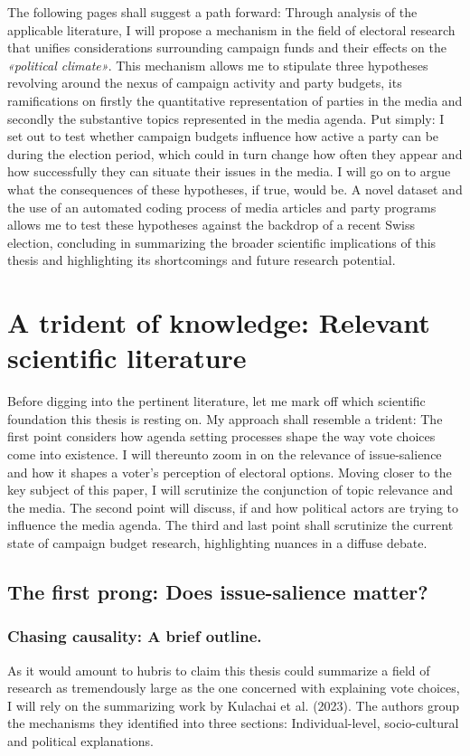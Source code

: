 \documentclass[11pt,a4paper]{article}
\begin{document}
The following pages shall suggest a path forward: Through analysis of the applicable literature, I will propose a mechanism in the field of electoral research that unifies considerations surrounding campaign funds and their effects on the \textit{«political climate»}. This mechanism allows me to stipulate three hypotheses revolving around the nexus of campaign activity and party budgets, its ramifications on firstly the quantitative representation of parties in the media and secondly the substantive topics represented in the media agenda. Put simply: I set out to test whether campaign budgets influence how active a party can be during the election period, which could in turn change how often they appear and how successfully they can situate their issues in the media. I will go on to argue what the consequences of these hypotheses, if true, would be. A novel dataset and the use of an automated coding process of media articles and party programs allows me to test these hypotheses against the backdrop of a recent Swiss election, concluding in summarizing the broader scientific implications of this thesis and highlighting its shortcomings and future research potential.


\newpage
{}
\section{A trident of knowledge: Relevant scientific literature }
Before digging into the pertinent literature, let me mark off which scientific foundation this thesis is resting on. My approach shall resemble a trident: The first point considers how agenda setting processes shape the way vote choices come into existence. I will thereunto zoom in on the relevance of issue-salience and how it shapes a voter’s perception of electoral options. Moving closer to the key subject of this paper, I will scrutinize the conjunction of topic relevance and the media. The second point will discuss, if and how political actors are trying to influence the media agenda. The third and last point shall scrutinize the current state of campaign budget research, highlighting nuances in a diffuse debate. 

\subsection{The first prong: Does issue-salience matter?}
\subsubsection{Chasing causality: A brief outline.}
As it would amount to hubris to claim this thesis could summarize a field of research as tremendously large as the one concerned with explaining vote choices, I will rely on the summarizing work by Kulachai et al. (2023). The authors group the mechanisms they identified into three sections: Individual-level, socio-cultural and political explanations. 
\end{document}
